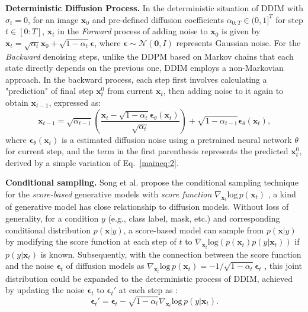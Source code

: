 \documentclass{article}
\begin{document}
\textbf{Deterministic Diffusion Process.} In the deterministic situation of DDIM \cite{song2020denoising} with $\sigma_t=0$, for an image $\boldsymbol{x}_0$ and pre-defined diffusion coefficients $\alpha_{0:T}\in(0,1]^T$ for step $t\in [0:T]$, $\boldsymbol{x}_t$ in the \textit{Forward} process of adding noise to $\boldsymbol{x}_0$ is given by $\boldsymbol{x}_t = \sqrt{\alpha_t}\boldsymbol{x}_0 + \sqrt{1-\alpha_t}\boldsymbol{\epsilon}$, where $\boldsymbol{\epsilon} \sim \mathcal{N}(\boldsymbol{0}, \boldsymbol{\mathit{I}})$ represents Gaussian noise.
For the \textit{Backward} denoising steps, unlike the DDPM \cite{ho2020denoising} based on Markov
chains that each state directly depends on the previous one, DDIM employs a non-Markovian approach. In the backward process, each step first involves calculating a "prediction" of final step $\boldsymbol{x}_t^0$ from current $\boldsymbol{x}_t$, then adding noise to it again to obtain $\boldsymbol{x}_{t-1}$, expressed as:
\begin{equation}\tag{2}
    \boldsymbol{x}_{t-1} = \sqrt{\alpha_{t-1}}(\frac{\boldsymbol{x}_t-\sqrt{1-\alpha_t}\boldsymbol{\epsilon}_\theta(\boldsymbol{x}_t)}{\sqrt{\alpha_t}}) + \sqrt{1-\alpha_{t-1}}\boldsymbol{\epsilon}_\theta(\boldsymbol{x}_t),
\label{maineq:2}
\end{equation}
where $\boldsymbol{\epsilon}_\theta(\boldsymbol{x}_t)$ is a estimated diffusion noise using a pretrained neural network $\theta$ for current step, and the term in the first parenthesis represents  the predicted $\boldsymbol{x}_t^0$, derived by a simple variation of Eq.~\eqref{maineq:2}. 


\textbf{Conditional sampling.} Song et al. \cite{song2020score} propose the conditional sampling technique for the \textit{score-based} generative models with \textit{score function} $\nabla_{\boldsymbol{x}_t}\text{log}\,p(\boldsymbol{x}_t)$ \cite{song2019generative}, a kind of generative model has close relationship to diffusion models. 
Without loss of generality, for a condition $y$ (e.g., class label, mask, etc.) and corresponding conditional distribution $p(\boldsymbol{x}|y)$, a score-based model can sample from $p(\boldsymbol{x}|y)$ by modifying the score function at each step of $t$ to $\nabla_{\boldsymbol{x}_t}\text{log}(p(\boldsymbol{x}_t)p(y|\boldsymbol{x}_t))$ if $p(y|\boldsymbol{x}_t)$ is known. Subsequently, with the connection between the score function and the noise $\boldsymbol{\epsilon}_t$ of diffusion models as $\nabla_{\boldsymbol{x}_t}\text{log}\,p(\boldsymbol{x}_t)=-{1}/{\sqrt{1-\alpha_t}}\boldsymbol{\epsilon}_t$ \cite{song2020score},
this joint distribution could be expanded to the deterministic process of DDIM, achieved by updating the noise $\boldsymbol{\epsilon}_t$ to $\boldsymbol{\epsilon}_t'$ at each step as  \cite{dhariwal2021diffusion}:
\begin{equation}\tag{3}
    \boldsymbol{\epsilon}_t' = \boldsymbol{\epsilon}_t - \sqrt{1-\alpha_t}\nabla_{\boldsymbol{x}_t}\text{log}\,p(y|\boldsymbol{x}_{t}).
\label{maineq:3}
\end{equation}
\end{document}
